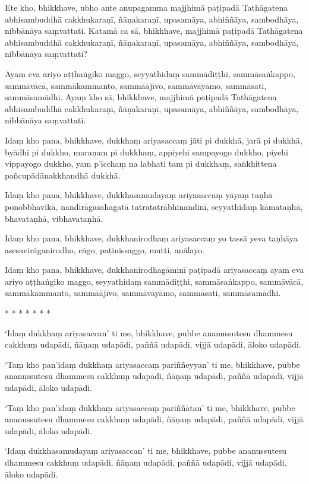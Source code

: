 Ete kho, bhikkhave, ubho ante anupagamma majjhimā paṭipadā Tathāgatena abhisambuddhā cakkhukaraṇī, ñāṇakaraṇī, upasamāya, abhiññāya, sambodhāya, nibbānāya saṃvattati. Katamā ca sā, bhikkhave, majjhimā paṭipadā Tathāgatena abhisambuddhā cakkhukaraṇī, ñāṇakaraṇī, upasamāya, abhiññāya, sambodhāya, nibbānāya saṃvattati?

Ayam eva ariyo aṭṭhaṅgiko maggo, seyyathidaṃ sammādiṭṭhi, sammāsaṅkappo, sammāvācā, sammākammanto, sammāājīvo, sammāvāyāmo, sammāsati, sammāsamādhi. Ayaṃ kho sā, bhikkhave, majjhimā paṭipadā Tathāgatena abhisambuddhā cakkhukaraṇī, ñāṇakaraṇī, upasamāya, abhiññāya, sambodhāya, nibbānāya saṃvattati.

Idaṃ kho pana, bhikkhave, dukkhaṃ ariyasaccaṃ jāti pi dukkhā, jarā pi dukkhā, byādhi pi dukkho, maraṇam pi dukkhaṃ, appiyehi sampayogo dukkho, piyehi vippayogo dukkho, yam p’icchaṃ na labhati tam pi dukkhaṃ, saṅkhittena pañcupādānakkhandhā dukkhā.

Idaṃ kho pana, bhikkhave, dukkhasamudayaṃ ariyasaccaṃ yāyaṃ taṇhā ponobbhavikā‚ nandirāgasahagatā tatratatrābhinandinī, seyyathidaṃ kāmataṇhā, bhavataṇhā, vibhavataṇhā.

Idaṃ kho pana, bhikkhave, dukkhanirodhaṃ ariyasaccaṃ yo tassā yeva taṇhāya asesavirāganirodho, cāgo, paṭinissaggo, mutti, anālayo.

Idaṃ kho pana, bhikkhave, dukkhanirodhagāminī paṭipadā ariyasaccaṃ ayam eva ariyo aṭṭhaṅgiko maggo, seyyathidaṃ sammādiṭṭhi, sammāsaṅkappo, sammāvācā, sammākammanto, sammāājīvo, sammāvāyāmo, sammāsati, sammāsamādhi.

\begin{center}
    * * * * * * *
\end{center}

‘Idaṃ dukkhaṃ ariyasaccan’ ti me, bhikkhave, pubbe ananussutesu dhammesu cakkhuṃ udapādi, ñāṇaṃ udapādi, paññā udapādi, vijjā udapādi, āloko udapādi.

‘Taṃ kho pan’idaṃ dukkhaṃ ariyasaccaṃ pariññeyyan’ ti me, bhikkhave, pubbe ananussutesu dhammesu cakkhuṃ udapādi, ñāṇaṃ udapādi, paññā udapādi, vijjā udapādi, āloko udapādi.

‘Taṃ kho pan’idaṃ dukkhaṃ ariyasaccaṃ pariññātan’ ti me, bhikkhave, pubbe ananussutesu dhammesu cakkhuṃ udapādi, ñāṇaṃ udapādi, paññā udapādi, vijjā udapādi, āloko udapādi.

‘Idaṃ dukkhasamudayaṃ ariyasaccan’ ti me, bhikkhave, pubbe ananussutesu dhammesu cakkhuṃ udapādi, ñāṇaṃ udapādi, paññā udapādi, vijjā udapādi, āloko udapādi.

